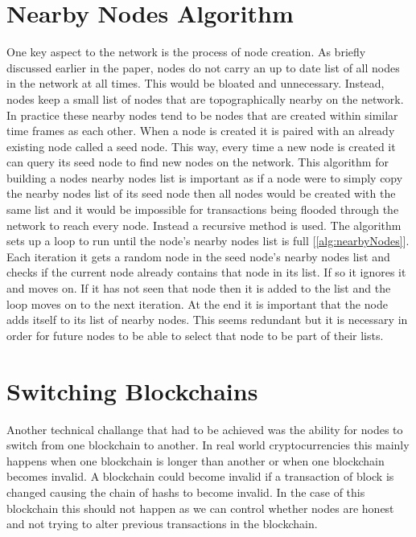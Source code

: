 \documentclass{l4proj}
\begin{document}
\section{Nearby Nodes Algorithm}
One key aspect to the network is the process of node creation. As briefly discussed earlier in the paper, nodes
do not carry an up to date list of all nodes in the network at all times. This would be bloated and unnecessary.
Instead, nodes keep a small list of nodes that are topographically nearby on the network. In practice these nearby
nodes tend to be nodes that are created within similar time frames as each other. When a node is created it is
paired with an already existing node called a seed node. This way, every time a new node is created it can query
its seed node to find new nodes on the network. This algorithm for building a nodes nearby nodes list is important
as if a node were to simply copy the nearby nodes list of its seed node then all nodes would be created with the
same list and it would be impossible for transactions being flooded through the network to reach every node. Instead
a recursive method is used. The algorithm sets up a loop to run until the node's nearby nodes list is full
[\ref{alg:nearbyNodes}]. Each iteration it gets a random node in the seed node's nearby nodes list and checks if 
the current node already contains that node in its list. If so it ignores it and moves on. If it has not seen 
that node then it is added to the list and the loop moves on to the next iteration. At the end it is important 
that the node adds itself to its list of nearby nodes. This seems redundant but it is necessary in order for 
future nodes to be able to select that node to be part of their lists.

\section{Switching Blockchains}
Another technical challange that had to be achieved was the ability for nodes to switch from one blockchain
to another. In real world cryptocurrencies this mainly happens when one blockchain is longer than another or
when one blockchain becomes invalid. A blockchain could become invalid if a transaction of block is changed 
causing the chain of hashs to become invalid. In the case of this blockchain this should not happen as we can
control whether nodes are honest and not trying to alter previous transactions in the blockchain.
\end{document}
